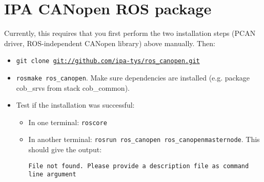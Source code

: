 \section{IPA CANopen ROS package}

Currently, this requires that you first perform the two installation steps (PCAN driver, ROS-independent CANopen library) above manually. Then:

\begin{itemize}
\item \texttt{git clone \url{git://github.com/ipa-tys/ros_canopen.git}}
\item \texttt{rosmake ros\_canopen}. Make sure dependencies are installed (e.g. package cob\_srvs from stack cob\_common).
\item Test if the installation was successful:
\begin{itemize}
\item In one terminal: \texttt{roscore}
\item In another terminal: \texttt{rosrun ros\_canopen ros\_canopenmasternode}. This should give the output:
 {\scriptsize
\begin{verbatim}File not found. Please provide a description file as command line argument\end{verbatim}}
\end{itemize}


\end{itemize}


